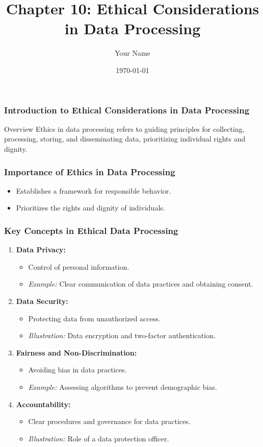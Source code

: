 \documentclass{beamer}
\title{Chapter 10: Ethical Considerations in Data Processing}
\author{Your Name}
\institute{Your Institution}
\date{\today}
\begin{document}
\frame{\titlepage}

\begin{frame}[fragile]
    \frametitle{Introduction to Ethical Considerations in Data Processing}
    \begin{block}{Overview}
        Ethics in data processing refers to guiding principles for collecting, processing, storing, and disseminating data, prioritizing individual rights and dignity.
    \end{block}
\end{frame}

\begin{frame}[fragile]
    \frametitle{Importance of Ethics in Data Processing}
    \begin{itemize}
        \item Establishes a framework for responsible behavior.
        \item Prioritizes the rights and dignity of individuals.
    \end{itemize}
\end{frame}

\begin{frame}[fragile]
    \frametitle{Key Concepts in Ethical Data Processing}
    \begin{enumerate}
        \item \textbf{Data Privacy:}
            \begin{itemize}
                \item Control of personal information.
                \item \textit{Example:} Clear communication of data practices and obtaining consent.
            \end{itemize}
        \item \textbf{Data Security:}
            \begin{itemize}
                \item Protecting data from unauthorized access.
                \item \textit{Illustration:} Data encryption and two-factor authentication.
            \end{itemize}
        \item \textbf{Fairness and Non-Discrimination:}
            \begin{itemize}
                \item Avoiding bias in data practices.
                \item \textit{Example:} Assessing algorithms to prevent demographic bias.
            \end{itemize}
        \item \textbf{Accountability:}
            \begin{itemize}
                \item Clear procedures and governance for data practices.
                \item \textit{Illustration:} Role of a data protection officer.
            \end{itemize}
    \end{enumerate}
\end{frame}
\end{document}
